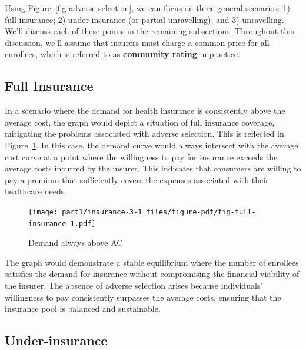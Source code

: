 \documentclass[
  letterpaper,
  DIV=11,
  numbers=noendperiod]{scrreport}
\theoremstyle{definition}
\theoremstyle{remark}
\begin{document}
Using Figure~\ref{fig-adverse-selection}, we can focus on three general
scenarios: 1) full insurance; 2) under-insurance (or partial
unravelling); and 3) unravelling. We'll discuss each of these points in
the remaining subsections. Throughout this discussion, we'll assume that
insurers must charge a common price for all enrollees, which is referred
to as \textbf{community rating} in practice.

\hypertarget{full-insurance}{%
\subsection*{Full Insurance}\label{full-insurance}}

In a scenario where the demand for health insurance is consistently
above the average cost, the graph would depict a situation of full
insurance coverage, mitigating the problems associated with adverse
selection. This is reflected in Figure~\ref{fig-full-insurance}. In this
case, the demand curve would always intersect with the average cost
curve at a point where the willingness to pay for insurance exceeds the
average costs incurred by the insurer. This indicates that consumers are
willing to pay a premium that sufficiently covers the expenses
associated with their healthcare needs.

\begin{figure}

{\centering \texttt{[image: part1/insurance-3-1\_files/figure-pdf/fig-full-insurance-1.pdf]}

}

\caption{\label{fig-full-insurance}Demand always above AC}

\end{figure}

The graph would demonstrate a stable equilibrium where the number of
enrollees satisfies the demand for insurance without compromising the
financial viability of the insurer. The absence of adverse selection
arises because individuals' willingness to pay consistently surpasses
the average costs, ensuring that the insurance pool is balanced and
sustainable.

\hypertarget{under-insurance}{%
\subsection*{Under-insurance}\label{under-insurance}}
\end{document}
